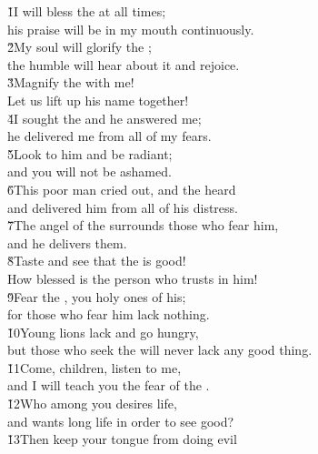 \begin{poetry}
\poeml \v{1}I will bless the  at all times; \\
\poemll    his praise will be in my mouth continuously. \\
\poeml \v{2}My soul will glorify the ; \\
\poemll    the humble will hear about it and rejoice. \\
\poeml \v{3}Magnify the  with me! \\
\poeml Let us lift up his name together! \\
\poeml \v{4}I sought the  and he answered me; \\
\poemll    he delivered me from all of my fears. \\
\poeml \v{5}Look to him and be radiant; \\
\poemll    and you will not be ashamed. \\
\poeml \v{6}This poor man cried out, and the  heard \\
\poemll    and delivered him from all of his distress. \\
\poeml \v{7}The angel of the  surrounds those who fear him, \\
\poemll    and he delivers them. \\
\poeml \v{8}Taste and see that the  is good! \\
\poemll    How blessed is the person who trusts in him! \\
\poeml \v{9}Fear the , you holy ones of his; \\
\poemll    for those who fear him lack nothing. \\
\poeml \v{10}Young lions lack and go hungry, \\
\poemll    but those who seek the  will never lack any good thing. \\
\poeml \v{11}Come, children, listen to me, \\
\poemll    and I will teach you the fear of the . \\
\poeml \v{12}Who among you desires life, \\
\poemll    and wants long life in order to see good? \\
\poeml \v{13}Then keep your tongue from doing evil \\

\end{poetry}
